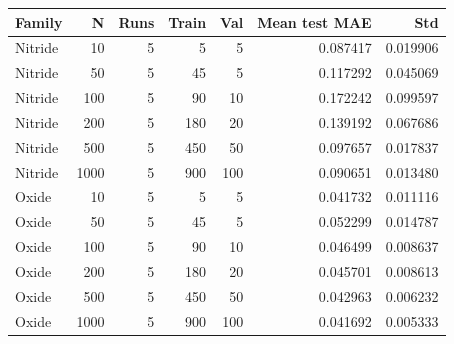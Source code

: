 \begin{tabular}{lrrrrrr}
\toprule
Family & N & Runs & Train & Val & Mean test MAE & Std \\
\midrule
Nitride & 10 & 5 & 5 & 5 & 0.087417 & 0.019906 \\
Nitride & 50 & 5 & 45 & 5 & 0.117292 & 0.045069 \\
Nitride & 100 & 5 & 90 & 10 & 0.172242 & 0.099597 \\
Nitride & 200 & 5 & 180 & 20 & 0.139192 & 0.067686 \\
Nitride & 500 & 5 & 450 & 50 & 0.097657 & 0.017837 \\
Nitride & 1000 & 5 & 900 & 100 & 0.090651 & 0.013480 \\
Oxide & 10 & 5 & 5 & 5 & 0.041732 & 0.011116 \\
Oxide & 50 & 5 & 45 & 5 & 0.052299 & 0.014787 \\
Oxide & 100 & 5 & 90 & 10 & 0.046499 & 0.008637 \\
Oxide & 200 & 5 & 180 & 20 & 0.045701 & 0.008613 \\
Oxide & 500 & 5 & 450 & 50 & 0.042963 & 0.006232 \\
Oxide & 1000 & 5 & 900 & 100 & 0.041692 & 0.005333 \\
\bottomrule
\end{tabular}
